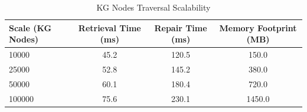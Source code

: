 \begin{table}[h]
\centering
\begin{tabular}{|l|c|c|c|}
\hline
Scale (KG Nodes) & Retrieval Time (ms) & Repair Time (ms) & Memory Footprint (MB) \\
\hline
10000 & 45.2 & 120.5 & 150.0 \\
25000 & 52.8 & 145.2 & 380.0 \\
50000 & 60.1 & 180.4 & 720.0 \\
100000 & 75.6 & 230.1 & 1450.0 \\
\hline
\end{tabular}
\caption{KG Nodes Traversal Scalability}
\end{table}
